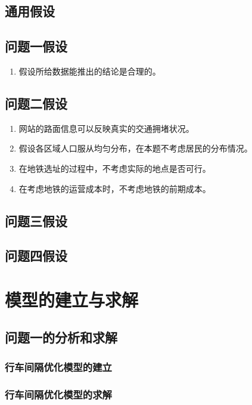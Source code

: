 \documentclass[12pt,a4paper]{mcmthesis}
\begin{document}
\subsection{通用假设}
\subsection{问题一假设}
\begin{enumerate}
	\item 假设所给数据能推出的结论是合理的。
\end{enumerate}
\subsection{问题二假设}
\begin{enumerate}
	\item 网站的路面信息可以反映真实的交通拥堵状况。
	\item 假设各区域人口服从均匀分布，在本题不考虑居民的分布情况。
	\item 在地铁选址的过程中，不考虑实际的地点是否可行。
	\item 在考虑地铁的运营成本时，不考虑地铁的前期成本。

\end{enumerate}

\subsection{问题三假设}
\subsection{问题四假设}

\section{模型的建立与求解}

\subsection{问题一的分析和求解}

\subsubsection{行车间隔优化模型的建立}

\subsubsection{行车间隔优化模型的求解}
\end{document}
